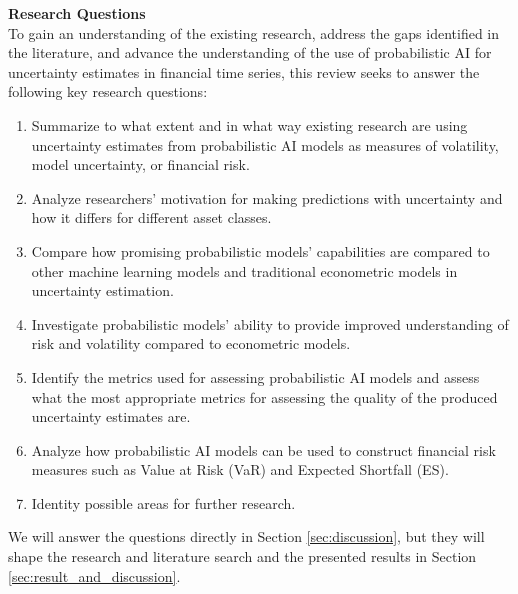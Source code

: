 \textbf{Research Questions}\\
To gain an understanding of the existing research, address the gaps identified in the literature, and advance the understanding of the use of probabilistic AI for uncertainty estimates in financial time series, this review seeks to answer the following key research questions: 
\begin{enumerate}
    \item Summarize to what extent and in what way existing research are using uncertainty estimates from probabilistic AI models as measures of volatility, model uncertainty, or financial risk.
    \item Analyze researchers' motivation for making predictions with uncertainty and how it differs for different asset classes.
    \item Compare how promising probabilistic models' capabilities are compared to other machine learning models and traditional econometric models in uncertainty estimation.
    \item Investigate probabilistic models' ability to provide improved understanding of risk and volatility compared to econometric models.
    \item Identify the metrics used for assessing probabilistic AI models and assess what the most appropriate metrics for assessing the quality of the produced uncertainty estimates are.
    \item Analyze how probabilistic AI models can be used to construct financial risk measures such as Value at Risk (VaR) and Expected Shortfall (ES).
    \item Identity possible areas for further research.
\end{enumerate}

We will answer the questions directly in Section \ref{sec:discussion}, but they will shape the research and literature search and the presented results in Section \ref{sec:result_and_discussion}. 

